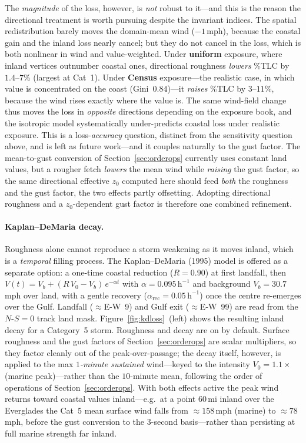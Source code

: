 \documentclass[11pt]{article}
\begin{document}
The \emph{magnitude} of the loss, however, is \emph{not} robust to it---and this is the
reason the directional treatment is worth pursuing despite the invariant indices. The
spatial redistribution barely moves the domain-mean wind ($-1$\,mph), because the coastal
gain and the inland loss nearly cancel; but they do not cancel in the loss, which is both
nonlinear in wind and value-weighted. Under \textbf{uniform} exposure, where inland
vertices outnumber coastal ones, directional roughness \emph{lowers} \%TLC by $1.4$--$7$\%
(largest at Cat~1). Under \textbf{Census} exposure---the realistic case, in which value is
concentrated on the coast (Gini~$0.84$)---it \emph{raises} \%TLC by $3$--$11$\%, because
the wind rises exactly where the value is. The same wind-field change thus moves the loss
in \emph{opposite} directions depending on the exposure book, and the isotropic model
systematically under-predicts coastal loss under realistic exposure. This is a
loss-\emph{accuracy} question, distinct from the sensitivity question above, and is left
as future work---and it couples naturally to the gust factor. The mean-to-gust conversion
of Section~\ref{sec:orderops} currently uses constant land values, but a rougher fetch
\emph{lowers} the mean wind while \emph{raising} the gust factor, so the same directional
effective $z_0$ computed here should feed \emph{both} the roughness and the gust factor,
the two effects partly offsetting. Adopting directional roughness and a $z_0$-dependent
gust factor is therefore one combined refinement.

\paragraph{Kaplan--DeMaria decay.}
Roughness alone cannot reproduce a storm weakening as it moves inland, which is
a \emph{temporal} filling process. The Kaplan--DeMaria (1995) model is offered as
a separate option: a one-time coastal reduction ($R=0.90$) at first landfall, then
$V(t)=V_b+(R\,V_0-V_b)\,e^{-\alpha t}$ with $\alpha=0.095\,\text{h}^{-1}$ and
background $V_b=30.7$\,mph over land, with a gentle recovery
($\alpha_{\text{rec}}=0.05\,\text{h}^{-1}$) once the centre re-emerges over the
Gulf. Landfall ($\approx$E-W~9) and Gulf exit ($\approx$E-W~99) are read from the
$N$-$S=0$ track land mask. Figure~\ref{fig:kdloss}~(left) shows the resulting
inland decay for a Category~5 storm. Roughness and decay are on by default. Surface
roughness and the gust factors of Section~\ref{sec:orderops} are scalar multipliers, so
they factor cleanly out of the peak-over-passage; the decay itself, however, is applied
to the max \emph{$1$-minute sustained} wind---keyed to the intensity
$V_0=1.1\times$(marine peak)---rather than the $10$-minute mean, following the order of
operations of Section~\ref{sec:orderops}. With both effects active the peak wind returns
toward coastal values inland---e.g.\ at a point $60$\,mi inland over the Everglades the
Cat~5 mean surface wind falls from $\approx\!158$\,mph (marine) to $\approx\!78$\,mph,
before the gust conversion to the $3$-second basis---rather than persisting at full
marine strength far inland.
\end{document}
